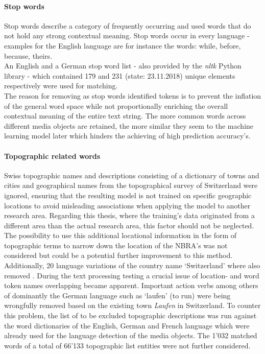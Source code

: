 \paragraph{Stop words}
Stop words describe a category of frequently occurring and used words that do not hold any strong contextual meaning. Stop words occur in every language - examples for the English language are for instance the words: while, before, because, theirs.\\
An English and a German stop word list - also provided by the \textit{nltk} Python library - which contained 179 and 231 (state: 23.11.2018) unique elements respectively were used for matching.\\
\newline
The reason for removing as stop words identified tokens is to prevent the inflation of the general word space while not proportionally enriching the overall contextual meaning of the entire text string. The more common words across different media objects are retained, the more similar they seem to the machine learning model later which hinders the achieving of high prediction accuracy's.

\paragraph{Topographic related words}
Swiss topographic names and descriptions consisting of a dictionary of towns and cities \parencite{Swisstopo2018Ortschaftenverzeichnis} and geographical names from the topographical survey of Switzerland \parencite{Swisstopo2018SwissNAMES3D} were ignored, ensuring that the resulting model is not trained on  specific geographic locations to avoid misleading associations when applying the model to another research area. Regarding this thesis, where the training's data originated from a different area than the actual research area, this factor should not be neglected. 
The possibility to use this additional locational information in the form of topographic terms to narrow down the location of the NBRA’s was not considered but could be a potential further improvement to this method. 
Additionally, 20 language variations of the country name ‘Switzerland’ where also removed \parencite{101languages2018SwitzerlandLanguages}. 
During the text processing testing a crucial issue of location- and word token names overlapping became apparent. Important action verbs among others of dominantly the German language such as ‘laufen’ (to run) were being wrongfully removed based on the existing town \textit{Laufen} in Switzerland. To counter this problem, the list of to be excluded topographic descriptions was run against the word dictionaries of the English, German and French language which were already used for the language detection of the media objects. The 1’032 matched words of a total of 66’133 topographic list entities were not further considered.

